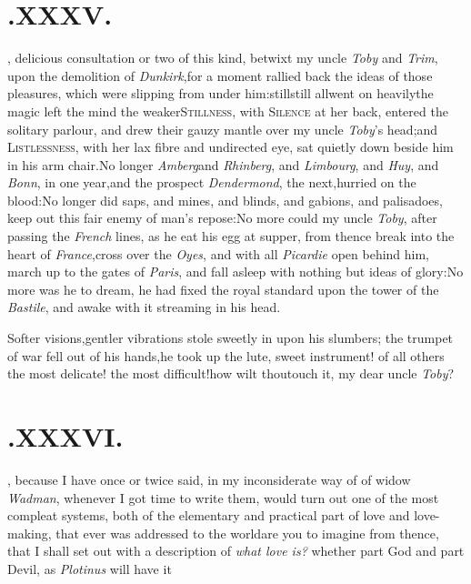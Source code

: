 \documentclass{article}
\begin{document}
\section{.\enspace XXXV.}

, delicious consultation or\break
two of this kind, betwixt my uncle\break 
\textit{Toby} and \textit{Trim},
upon the demolition of \textit{Dunkirk},\tsk for a moment rallied
back the ideas of those pleasures, which were slipping from under
him:\tsk still\tsk still all\break went on
heavily\tsh the magic left the mind the
weaker\tsk \textsc{Stillness}, with \textsc{Silence}
at her back, entered the solitary parlour, and drew their gauzy
mantle over my uncle \textit{Toby}’s head;\tsk\!\tsk and\break
\textsc{Listlessness}, with her lax fibre and un\-directed eye,
sat quietly down beside him in his arm chair.\tsh No longer
\textit{Amberg}\break and \textit{Rhinberg}, and \textit{Limbourg}, and
\textit{Huy}, and \textit{Bonn}, in one year,\tsk and the prospect
\break
\textit{Dendermond}, the next,\tsk hurried on the blood:\tsk No
longer did saps, and mines, and blinds, and gabions, and
palisadoes, keep out this fair enemy of man’s
repose:\tsh No more could my uncle\break
\textit{Toby}, after passing the \textit{French} lines, as\break
he eat his egg at supper, from thence\break
break into the heart of \textit{France},\tsk cross\break
over the \textit{Oyes}, and with all \textit{Picardie} open\break
behind him, march up to the gates of\break
\textit{Paris}, and fall asleep with nothing but\break
ideas of glory:\tsh No more was he to\break
dream, he had fixed the royal standard\break
upon the tower of the \textit{Bastile}, and awake\break
with it streaming in his head.

\tsh Softer visions,\tsk gentler vibrations stole
sweetly in upon his slumbers;\break
\tsk the trumpet of war fell out of
his hands,\tsk he took up the lute, sweet instrument! of all
others the most delicate! the most difficult!\tsh how wilt
thou\break touch it, my dear uncle \textit{Toby}?

\vfill{}\eject
\null
\section{.\enspace XXXVI.}

, because I have once or twice
said, in my inconsiderate way of \break
{}
of
widow \textit{Wadman}, whenever I got time to write them, would turn
out one of the most compleat systems, both of the elementary and
practical part of love and love-making, that ever was addressed to
the world\tsh are you to imagine from thence, that I shall
set out with a description of \textit{what love is?} whether part God
and part Devil, as \textit{Plotinus} will have\break
it\tsh
\end{document}
